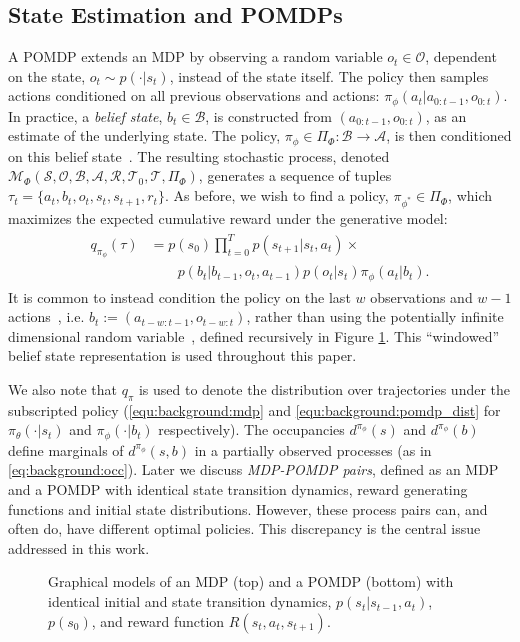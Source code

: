 \subsection{State Estimation and POMDPs}\label{pomdp_background}
A POMDP extends an MDP by observing a random variable $o_t \in \mathcal{O}$, dependent on the state, $o_t \sim p(\cdot | s_t)$, instead of the state itself. The policy then samples actions conditioned on all previous observations and actions: $\pi_{\phi} ( a_t | a_{0:t-1}, o_{0:t})$.  In practice, a \emph{belief state}, $b_t \in \mathcal{B}$, is constructed from $(a_{0:t-1}, o_{0:t})$, as an estimate of the underlying state.  The policy, $\pi_{\phi} \in \Pi_{\Phi}\!:\! \mathcal{B} \rightarrow \mathcal{A}$, is then conditioned on this belief state~\citep{doshi2013bayesian, igl2018dvrl, kaelbling1998planning}. The resulting stochastic process, denoted $\mathcal{M}_{\Phi}(\mathcal{S},\mathcal{O},\mathcal{B},\mathcal{A},\mathcal{R},\mathcal{T}_0,\mathcal{T},\Pi_{\Phi})$, generates a sequence of tuples $\tau_t\!=\!\{ a_t,b_t,o_t,s_t,s_{t+1},r_t\}$. As before, we wish to find a policy, $\pi_{\phi^*}\in\Pi_{\Phi}$, which maximizes the expected cumulative reward under the generative model: 
\begin{align}
    \begin{aligned}
       q_{\pi_{\phi}}(\tau) &= p(s_0) \prod\nolimits_{t=0}^{T} p(s_{t+1}|s_t,a_t) \times \\
     & \quad \quad p(b_t| b_{t-1}, o_{t}, a_{t-1}) p(o_t|s_t) \pi_{\phi}(a_t|b_t).\label{equ:background:pomdp_dist}
    \end{aligned}
\end{align}
It is common to instead condition the policy on the last $w$ observations and $w-1$ actions~\citep{laskin2020reinforcement, murphy2000survey}, i.e. $b_t := \left( a_{t-w:t-1}, o_{t-w:t} \right)$, rather than using the potentially infinite dimensional random variable~\citep{murphy2000survey}, defined recursively in Figure \ref{fig:dpgm}.  This ``windowed'' belief state representation is used throughout this paper.  

We also note that $q_{\pi}$ is used to denote the distribution over trajectories under the subscripted policy (\eqref{equ:background:mdp} and \eqref{equ:background:pomdp_dist} for $\pi_{\theta}(\cdot|s_t)$ and $\pi_{\phi}(\cdot|b_t)$ respectively).  The occupancies $d^{\pi_{\phi}}(s)$ and $d^{\pi_{\phi}}(b)$ define marginals of $d^{\pi_{\phi}}(s, b)$ in a partially observed processes (as in \eqref{eq:background:occ}).  Later we discuss \emph{MDP-POMDP pairs}, defined as an MDP and a POMDP with identical state transition dynamics, reward generating functions and initial state distributions. However, these process pairs can, and often do, have different optimal policies. This discrepancy is the central issue addressed in this work.
\begin{figure}
    \centering 
    
    \caption{Graphical models of an MDP (top) and a POMDP (bottom) with identical initial and state transition dynamics, $p(s_t | s_{t-1}, a_{t})$, $p(s_0)$, and reward function $R(s_t, a_t,s_{t+1})$.}
    \label{fig:dpgm}
\end{figure}

